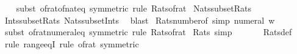 \begin{isabellebody}
%
\isadelimproof
\ \ %
\endisadelimproof
%
\isatagproof
{}\isamarkupfalse%
\ {\isacharparenleft}{\kern0pt}subst\ of{\isacharunderscore}{\kern0pt}rat{\isacharunderscore}{\kern0pt}of{\isacharunderscore}{\kern0pt}nat{\isacharunderscore}{\kern0pt}eq\ {\isacharbrackleft}{\kern0pt}symmetric{\isacharbrackright}{\kern0pt}{\isacharparenright}{\kern0pt}\ {\isacharparenleft}{\kern0pt}rule\ Rats{\isacharunderscore}{\kern0pt}of{\isacharunderscore}{\kern0pt}rat{\isacharparenright}{\kern0pt}%
\endisatagproof
{\isafoldproof}%
%
\isadelimproof
\isanewline
%
\endisadelimproof
\isanewline
{}\isamarkupfalse%
\ Nats{\isacharunderscore}{\kern0pt}subset{\isacharunderscore}{\kern0pt}Rats{\isacharcolon}{\kern0pt}\ {\isachardoublequoteopen}{\isasymnat}\ {\isasymsubseteq}\ {\isasymrat}{\isachardoublequoteclose}\isanewline
%
\isadelimproof
\ \ %
\endisadelimproof
%
\isatagproof
{}\isamarkupfalse%
\ Ints{\isacharunderscore}{\kern0pt}subset{\isacharunderscore}{\kern0pt}Rats\ Nats{\isacharunderscore}{\kern0pt}subset{\isacharunderscore}{\kern0pt}Ints\ \isamarkupfalse%
\ blast%
\endisatagproof
{\isafoldproof}%
%
\isadelimproof
\isanewline
%
\endisadelimproof
\isanewline
{}\isamarkupfalse%
\ Rats{\isacharunderscore}{\kern0pt}number{\isacharunderscore}{\kern0pt}of\ {\isacharbrackleft}{\kern0pt}simp{\isacharbrackright}{\kern0pt}{\isacharcolon}{\kern0pt}\ {\isachardoublequoteopen}numeral\ w\ {\isasymin}\ {\isasymrat}{\isachardoublequoteclose}\isanewline
%
\isadelimproof
\ \ %
\endisadelimproof
%
\isatagproof
{}\isamarkupfalse%
\ {\isacharparenleft}{\kern0pt}subst\ of{\isacharunderscore}{\kern0pt}rat{\isacharunderscore}{\kern0pt}numeral{\isacharunderscore}{\kern0pt}eq\ {\isacharbrackleft}{\kern0pt}symmetric{\isacharbrackright}{\kern0pt}{\isacharparenright}{\kern0pt}\ {\isacharparenleft}{\kern0pt}rule\ Rats{\isacharunderscore}{\kern0pt}of{\isacharunderscore}{\kern0pt}rat{\isacharparenright}{\kern0pt}%
\endisatagproof
{\isafoldproof}%
%
\isadelimproof
\isanewline
%
\endisadelimproof
\isanewline
{}\isamarkupfalse%
\ Rats{\isacharunderscore}{\kern0pt}{}\ {\isacharbrackleft}{\kern0pt}simp{\isacharbrackright}{\kern0pt}{\isacharcolon}{\kern0pt}\ {\isachardoublequoteopen}{}\ {\isasymin}\ {\isasymrat}{\isachardoublequoteclose}\isanewline
%
\isadelimproof
\ \ %
\endisadelimproof
%
\isatagproof
{}\isamarkupfalse%
\ Rats{\isacharunderscore}{\kern0pt}def\ \isamarkupfalse%
\ {\isacharparenleft}{\kern0pt}rule\ range{\isacharunderscore}{\kern0pt}eqI{\isacharparenright}{\kern0pt}\ {\isacharparenleft}{\kern0pt}rule\ of{\isacharunderscore}{\kern0pt}rat{\isacharunderscore}{\kern0pt}{}\ {\isacharbrackleft}{\kern0pt}symmetric{\isacharbrackright}{\kern0pt}{\isacharparenright}{\kern0pt}%

\end{isabellebody}
